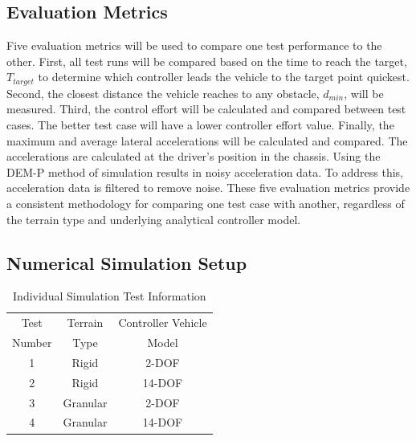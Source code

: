 \documentclass[12pt,twocolumn]{article}
\begin{document}

\subsection{Evaluation Metrics}\label{ss:Metrics}
Five evaluation metrics will be used to compare one test performance to the other. First, all test runs will be compared based on the time to reach the target, $T_{target}$ to determine which controller leads the vehicle to the target point quickest. Second, the closest distance the vehicle reaches to any obstacle, $d_{min}$, will be measured. Third, the control effort will be calculated and compared between test cases. The better test case will have a lower controller effort value. Finally, the maximum and average lateral accelerations will be calculated and compared. The accelerations are calculated at the driver's position in the chassis. Using the DEM-P method of simulation results in noisy acceleration data. To address this, acceleration data is filtered to remove noise. These five evaluation metrics provide a consistent methodology for comparing one test case with another, regardless of the terrain type and underlying analytical controller model.


\subsection{Numerical Simulation Setup }\label{ss:Setup}

\begin{table}
\begin{center}
	\begin{tabular}{||c |c | c||} 
		\hline
		Test  & Terrain  & Controller Vehicle \\
		Number &  Type & Model\\ [0.5ex] 	
		\hline\hline
		1 & Rigid & 2-DOF \\ 
		\hline
		2 & Rigid & 14-DOF \\
		\hline
		3 & Granular & 2-DOF \\
		\hline
		4 & Granular & 14-DOF \\
		\hline
	\end{tabular}
\end{center}
\caption{Individual Simulation Test Information}
\label{t:TestMatrix}
\end{table}
\end{document}
